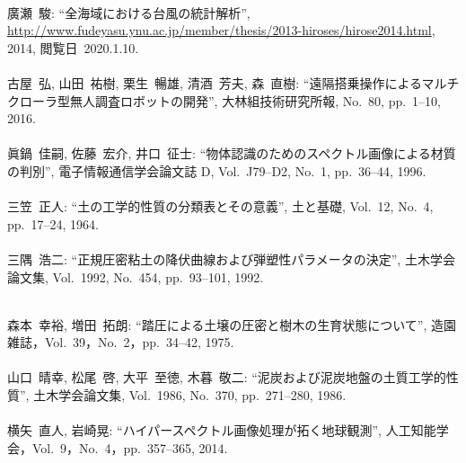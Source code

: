 \begin{mythebibliography}{}
\leavevmode \\廣瀬~駿:
\newblock ``全海域における台風の統計解析'', 
\newblock \url{http://www.fudeyasu.ynu.ac.jp/member/thesis/2013-hiroses/hirose2014.html}, 2014, 
\newblock \mbox{閲覧日 2020.1.10}.
\\

\leavevmode \\古屋~弘, 山田~祐樹, 栗生~暢雄, 清酒~芳夫, 森~直樹:
\newblock ``遠隔搭乗操作によるマルチクローラ型無人調査ロボットの開発'',
\newblock 大林組技術研究所報, No.~80, pp.~1--10, 2016.
\\

\leavevmode \\眞鍋~佳嗣, 佐藤~宏介, 井口~征士:
\newblock ``物体認識のためのスペクトル画像による材質の判別'',
\newblock 電子情報通信学会論文誌 D, Vol.~J79--D2, No.~1, pp.~36--44, 1996.
\\

\leavevmode \\三笠~正人:
\newblock ``土の工学的性質の分類表とその意義'',
\newblock 土と基礎, Vol.~12, No.~4, pp.~17--24, 1964.
\\

\leavevmode \\三隅~浩二:
\newblock ``正規圧密粘土の降伏曲線および弾塑性パラメータの決定'',
\newblock 土木学会論文集, Vol.~1992, No.~454, pp.~93--101, 1992.
\\

\newpage

\leavevmode \\森本~幸裕, 増田~拓朗:
\newblock ``踏圧による土壌の圧密と樹木の生育状態について'',
\newblock 造園雑誌，Vol.~39，No.~2，pp.~34--42, 1975.
\\

\leavevmode \\山口~晴幸, 松尾~啓, 大平~至徳, 木暮~敬二:
\newblock ``泥炭および泥炭地盤の土質工学的性質'',
\newblock 土木学会論文集, Vol.~1986, No.~370, pp.~271--280, 1986.
\\

\leavevmode \\横矢~直人, 岩崎晃:
\newblock ``ハイパースペクトル画像処理が拓く地球観測'',
\newblock 人工知能学会，Vol.~9，No.~4，pp.~357--365, 2014.
\\


\end{mythebibliography}
